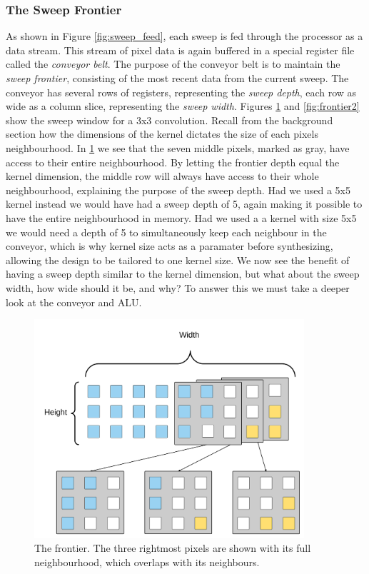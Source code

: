 \subsubsection{The Sweep Frontier}
As shown in Figure \ref{fig:sweep_feed}, each sweep is fed through the processor as a data stream.
This stream of pixel data is again buffered in a special register file called the \textit{conveyor belt}.
The purpose of the conveyor belt is to maintain the \textit{sweep frontier}, consisting of the most recent data from the current sweep.
The conveyor has several rows of registers, representing the \textit{sweep depth}, each row as wide as a column slice, representing the \textit{sweep width}.
Figures \ref{fig:frontier1} and \ref{fig:frontier2} show the sweep window for a 3x3 convolution.
Recall from the background section how the dimensions of the kernel dictates the size of each pixels neighbourhood.
In \ref{fig:frontier1} we see that the seven middle pixels, marked as gray, have access to their entire neighbourhood.
By letting the frontier depth equal the kernel dimension, the middle row will always have access to their whole neighbourhood, explaining the purpose of the sweep depth.
Had we used a 5x5 kernel instead we would have had a sweep depth of 5, again making it possible to have the entire neighbourhood in memory.
Had we used a a kernel with size 5x5 we would need a depth of 5 to simultaneously keep each neighbour in the conveyor, which is why kernel size acts as a paramater before synthesizing, allowing the design to be tailored to one kernel size.
We now see the benefit of having a sweep depth similar to the kernel dimension, but what about the sweep width, how wide should it be, and why?
To answer this we must take a deeper look at the conveyor and ALU.
\clearpage
\begin{figure}[h!]
    \centering
    \includegraphics[width=10cm]{img/frontier1.png}
    \caption{The frontier. The three rightmost pixels are shown with its full neighbourhood, which overlaps with its neighbours.}
    \label{fig:frontier1}
\end{figure}

